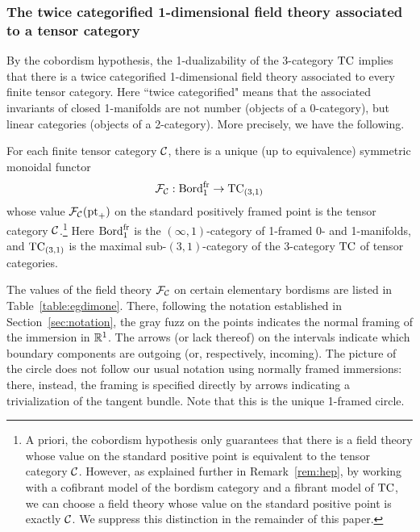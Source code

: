 \documentclass{amsart}
\begin{document}
\subsubsection{The twice categorified 1-dimensional field theory associated to a tensor category}

By the cobordism hypothesis, the 1-dualizability of the 3-category $\mathrm{TC}$ implies that there is a twice categorified 1-dimensional field theory associated to every finite tensor category.  Here ``twice categorified" means that the associated invariants of closed 1-manifolds are not number (objects of a 0-category), but linear categories (objects of a 2-category).  More precisely, we have the following.
\begin{corollary}
For each finite tensor category $\mathcal C$, there is a unique (up to equivalence) symmetric monoidal functor
\[
\mathcal F_\mathcal C: \mathrm{Bord}^\mathrm{fr}_1 \rightarrow \mathrm{TC}_{(3,1)}
\]
whose value $\mathcal F_\mathcal C(\mathrm{pt}_+)$ on the standard positively framed point is the tensor category $\mathcal C$.\footnote{A priori, the cobordism hypothesis only guarantees that there is a field theory whose value on the standard positive point is equivalent to the tensor category $\mathcal C$.  However, as explained further in Remark~\ref{rem:hep}, by working with a cofibrant model of the bordism category and a fibrant model of $\mathrm{TC}$, we can choose a field theory whose value on the standard positive point is exactly $\mathcal C$.  We suppress this distinction in the remainder of this paper.\label{ftn:exactly}}  Here $\mathrm{Bord}^\mathrm{fr}_1$ is the $(\infty,1)$-category of 1-framed 0- and 1-manifolds, and $\mathrm{TC}_{(3,1)}$ is the maximal sub-$(3,1)$-category of the 3-category $\mathrm{TC}$ of tensor categories.
\end{corollary}

The values of the field theory $\mathcal F_\mathcal C$ on certain elementary bordisms are listed in Table~\ref{table:egdimone}.  There, following the notation established in Section~\ref{sec:notation}, the gray fuzz on the points indicates the normal framing of the immersion in $\mathbb R^1$.  The arrows (or lack thereof) on the intervals indicate which boundary components are outgoing (or, respectively, incoming).  The picture of the circle does not follow our usual notation using normally framed immersions: there, instead, the framing is specified directly by arrows indicating a trivialization of the tangent bundle.  Note that this is the unique 1-framed circle.
\end{document}

